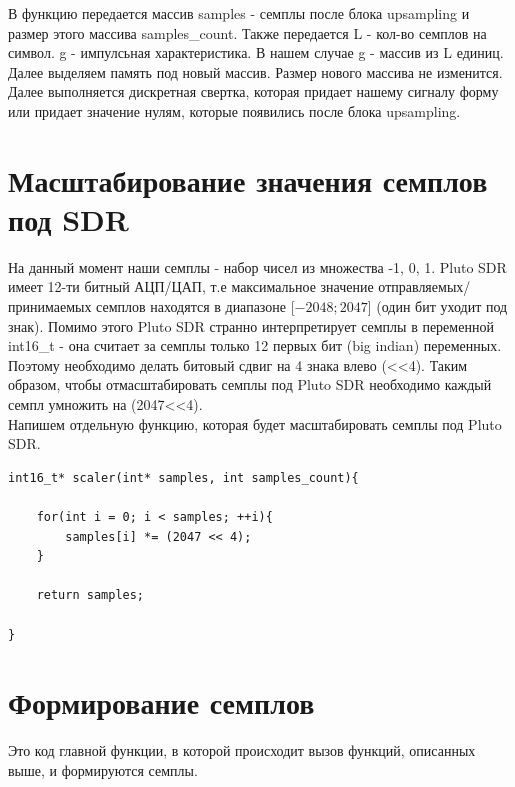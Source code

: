 В функцию передается массив samples - семплы после блока upsampling и размер этого массива samples\_count. Также передается L - кол-во семплов на 
символ. g - импулсьная характеристика. В нашем случае g - массив из L единиц. Далее выделяем память под новый массив. Размер нового массива
не изменится. Далее выполняется дискретная свертка, которая придает нашему сигналу форму или придает значение нулям, которые появились
после блока upsampling.

\section{Масштабирование значения семплов под SDR}

На данный момент наши семплы - набор чисел из множества {-1, 0, 1}. Pluto SDR имеет 12-ти битный АЦП/ЦАП, т.е максимальное значение отправляемых/
принимаемых семплов находятся в диапазоне [$-2048;2047$] (один бит уходит под знак). Помимо этого Pluto SDR странно интерпретирует
семплы в переменной int16\_t - она считает за семплы только 12 первых бит (big indian) переменных. Поэтому необходимо делать битовый сдвиг на 4 знака
влево (<<4). Таким образом, чтобы отмасштабировать семплы под Pluto SDR необходимо каждый семпл умножить на (2047<<4). \\

Напишем отдельную функцию, которая будет масштабировать семплы под Pluto SDR.

\begin{lstlisting}
int16_t* scaler(int* samples, int samples_count){
    
    for(int i = 0; i < samples; ++i){
        samples[i] *= (2047 << 4);
    }
    
    return samples;

}
\end{lstlisting}

\section{Формирование семплов}

Это код главной функции, в которой происходит вызов функций, описанных выше, и формируются семплы.

